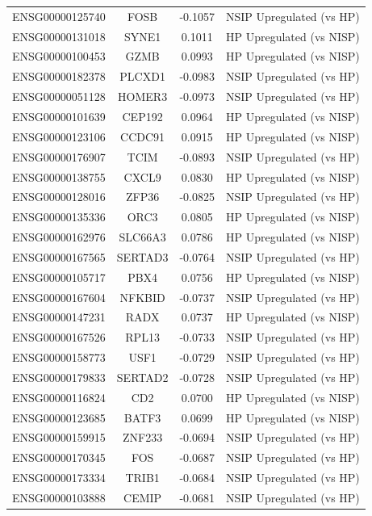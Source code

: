 \documentclass[
]{article}
\begin{document}
\begin{singlespace}
\begin{longtable}[t]{lccc}
\addlinespace
ENSG00000125740 & FOSB & -0.1057 & NSIP Upregulated (vs HP)\\
ENSG00000131018 & SYNE1 & 0.1011 & HP Upregulated (vs NISP)\\
ENSG00000100453 & GZMB & 0.0993 & HP Upregulated (vs NISP)\\
ENSG00000182378 & PLCXD1 & -0.0983 & NSIP Upregulated (vs HP)\\
ENSG00000051128 & HOMER3 & -0.0973 & NSIP Upregulated (vs HP)\\
\addlinespace
ENSG00000101639 & CEP192 & 0.0964 & HP Upregulated (vs NISP)\\
ENSG00000123106 & CCDC91 & 0.0915 & HP Upregulated (vs NISP)\\
ENSG00000176907 & TCIM & -0.0893 & NSIP Upregulated (vs HP)\\
ENSG00000138755 & CXCL9 & 0.0830 & HP Upregulated (vs NISP)\\
ENSG00000128016 & ZFP36 & -0.0825 & NSIP Upregulated (vs HP)\\
\addlinespace
ENSG00000135336 & ORC3 & 0.0805 & HP Upregulated (vs NISP)\\
ENSG00000162976 & SLC66A3 & 0.0786 & HP Upregulated (vs NISP)\\
ENSG00000167565 & SERTAD3 & -0.0764 & NSIP Upregulated (vs HP)\\
ENSG00000105717 & PBX4 & 0.0756 & HP Upregulated (vs NISP)\\
ENSG00000167604 & NFKBID & -0.0737 & NSIP Upregulated (vs HP)\\
\addlinespace
ENSG00000147231 & RADX & 0.0737 & HP Upregulated (vs NISP)\\
ENSG00000167526 & RPL13 & -0.0733 & NSIP Upregulated (vs HP)\\
ENSG00000158773 & USF1 & -0.0729 & NSIP Upregulated (vs HP)\\
ENSG00000179833 & SERTAD2 & -0.0728 & NSIP Upregulated (vs HP)\\
ENSG00000116824 & CD2 & 0.0700 & HP Upregulated (vs NISP)\\
\addlinespace
ENSG00000123685 & BATF3 & 0.0699 & HP Upregulated (vs NISP)\\
ENSG00000159915 & ZNF233 & -0.0694 & NSIP Upregulated (vs HP)\\
ENSG00000170345 & FOS & -0.0687 & NSIP Upregulated (vs HP)\\
ENSG00000173334 & TRIB1 & -0.0684 & NSIP Upregulated (vs HP)\\
ENSG00000103888 & CEMIP & -0.0681 & NSIP Upregulated (vs HP)\\

\end{longtable}
\end{singlespace}
\end{document}
